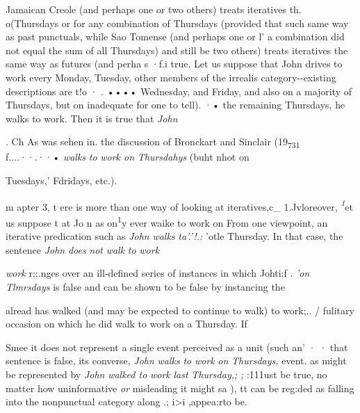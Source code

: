 
Jamaican Creole (and perhaps one or two others) treats iteratives th{\textquotedbl}{\textquotedbl}. o(Thursdays or for any combination of Thursdays (provided that such same way as past punctuals, while Sao Tomense (and perhaps one or l' a combination did not equal the sum of all Thursdays) and still be
two others) treats iteratives the same way as futures (and perha s ·f.i
true. Let us suppose that John drives to work every Monday, Tuesday,
other members of the irrealis category-{}-existing descriptions are t!o · . •••• Wednesday, and Friday, and also on a majority of Thursdays, but on inadequate for one to tell). ·• the remaining Thursdays, he walks to work. Then it is true that \textit{John}

. Ch As was sehen in. the discussion of Bronckart and Sinclair (19\textsubscript{7}\textsubscript{3}\textsubscript{1}\textsubscript{ }f....··.··• \textit{walks} \textit{to} \textit{w}\textit{ork on} \textit{Thursd}\textit{a}\textit{h}\textit{ys }(buht nhot on

Tuesdays,' Fdridays, etc.).

m apter 3, t ere is more than one way of looking at iteratives,c\_ 1.Jvloreover, \textit{\textsuperscript{1}}et us suppose t at Jo n as on\textsuperscript{1}y ever waike to work on From one viewpoint, an iterative predication such as \textit{John} \textit{wal}\textit{k}\textit{s} \textit{t}\textit{a}\textit{'}\textit{.}\textit{'!.: }'otle Thursday. In that case, the sentence \textit{John} \textit{does} \textit{not} \textit{walk} \textit{to} \textit{work}

\textit{work }r;;.nges over an ill-defined series of instances in which Johti;f . \textit{'}\textit{on} \textit{Tlmrsdays} is false and can be shown to be false by instancing the

alread has walked (and may be expected to continue to walk) to work;.. / fulitary occasion on which he did walk to work on a Thursday. If

Smee it does not represent a single event perceived as a unit (such an' · · that sentence is false, its converse, \textit{John} \textit{walks} \textit{to} \textit{work} \textit{on} \textit{Thursdays,} event. as might be represented by \textit{John} \textit{walked to} \textit{work} \textit{last} \textit{Thursday,;} \textit{; }:111ust be true, no matter how uninformative \textit{or} misleading it might sa ), tt can be reg:{\textquotedbl}ded as falling into the nonpunctual category along .; i{\textgreater}i ,appea:rto be.


